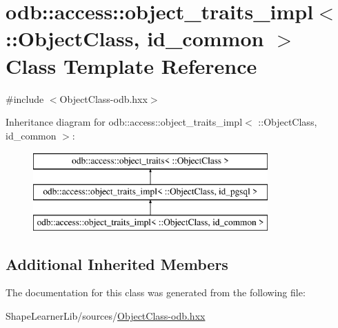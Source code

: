 \hypertarget{classodb_1_1access_1_1object__traits__impl_3_01_1_1_object_class_00_01id__common_01_4}{}\section{odb\+:\+:access\+:\+:object\+\_\+traits\+\_\+impl$<$ \+:\+:Object\+Class, id\+\_\+common $>$ Class Template Reference}
\label{classodb_1_1access_1_1object__traits__impl_3_01_1_1_object_class_00_01id__common_01_4}


{\ttfamily \#include $<$Object\+Class-\/odb.\+hxx$>$}

Inheritance diagram for odb\+:\+:access\+:\+:object\+\_\+traits\+\_\+impl$<$ \+:\+:Object\+Class, id\+\_\+common $>$\+:\begin{figure}[H]
\begin{center}
\leavevmode
\includegraphics[height=3.000000cm]{da/dd6/classodb_1_1access_1_1object__traits__impl_3_01_1_1_object_class_00_01id__common_01_4}
\end{center}
\end{figure}
\subsection*{Additional Inherited Members}


The documentation for this class was generated from the following file\+:\begin{DoxyCompactItemize}
\item 
Shape\+Learner\+Lib/sources/\hyperlink{_object_class-odb_8hxx}{Object\+Class-\/odb.\+hxx}\end{DoxyCompactItemize}

